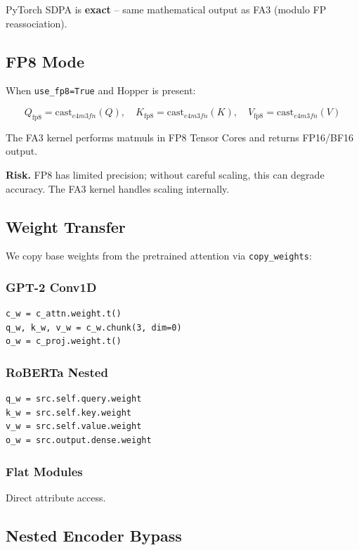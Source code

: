 PyTorch SDPA is \textbf{exact} -- same mathematical output as FA3 (modulo FP 
reassociation).

\subsection{FP8 Mode}

When \texttt{use\_fp8=True} and Hopper is present:

\[
Q_\text{fp8} = \text{cast}_{e4m3fn}(Q), \quad
K_\text{fp8} = \text{cast}_{e4m3fn}(K), \quad
V_\text{fp8} = \text{cast}_{e4m3fn}(V)
\tag{4.1}
\]

The FA3 kernel performs matmuls in FP8 Tensor Cores and returns FP16/BF16 
output.

\textbf{Risk.} FP8 has limited precision; without careful scaling, this can 
degrade accuracy. The FA3 kernel handles scaling internally.

\subsection{Weight Transfer}

We copy base weights from the pretrained attention via \texttt{copy\_weights}:

\subsubsection{GPT-2 Conv1D}

\begin{lstlisting}
c_w = c_attn.weight.t()
q_w, k_w, v_w = c_w.chunk(3, dim=0)
o_w = c_proj.weight.t()
\end{lstlisting}

\subsubsection{RoBERTa Nested}

\begin{lstlisting}
q_w = src.self.query.weight
k_w = src.self.key.weight
v_w = src.self.value.weight
o_w = src.output.dense.weight
\end{lstlisting}

\subsubsection{Flat Modules}

Direct attribute access.

\subsection{Nested Encoder Bypass}

